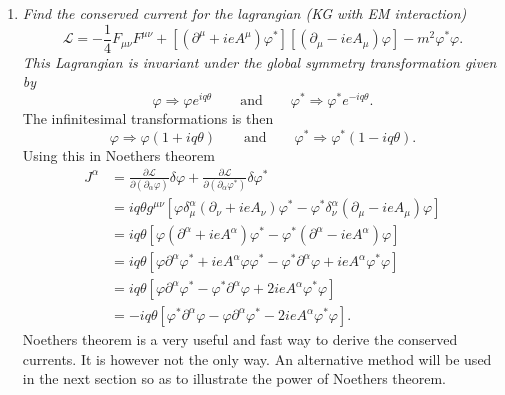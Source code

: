 \begin{example}
\begin{enumerate}
		\item \emph{Find the conserved current for the lagrangian (KG with EM interaction)}
		\begin{equation}
			\mathcal{L}=-\frac{1}{4}F_{\mu\nu}F^{\mu\nu}+[(\partial^{\mu}+ieA^{\mu})\varphi^*][(\partial_{\mu}-ieA_\mu)\varphi]-m^2\varphi^*\varphi.
		\end{equation} 
		\emph{This Lagrangian is invariant under the global symmetry transformation given by}
		\begin{equation}
			\varphi\Rightarrow \varphi e^{iq\theta} \qquad \mbox{and} \qquad \varphi^*\Rightarrow \varphi^* e^{-iq\theta}.
		\end{equation} 
		The infinitesimal transformations is then
		\begin{equation}
			\varphi\Rightarrow \varphi (1+iq\theta) \qquad \mbox{and} \qquad \varphi^*\Rightarrow \varphi^* (1-iq\theta).
		\end{equation} 
		Using this in Noethers theorem
		\begin{equation}
			\begin{split}
				J^\alpha&=\frac{\partial \mathcal{L}}{\partial (\partial_\alpha \varphi)}\delta\varphi+\frac{\partial \mathcal{L}}{\partial (\partial_\alpha \varphi^*)}\delta\varphi^*\\
				&=iq\theta g^{\mu\nu}[\varphi\delta_\mu^\alpha(\partial_{\nu}+ieA_{\nu})\varphi^*-\varphi^*\delta_{\nu}^\alpha(\partial_{\mu}-ieA_\mu)\varphi]\\
				&=iq\theta[\varphi(\partial^{\alpha}+ieA^{\alpha})\varphi^*-\varphi^*(\partial^{\alpha}-ieA^\alpha)\varphi]\\
				&=iq\theta[\varphi\partial^{\alpha}\varphi^*+ieA^{\alpha}\varphi\varphi^*-\varphi^*\partial^{\alpha}\varphi+ieA^\alpha\varphi^*\varphi]\\
				&=iq\theta[\varphi\partial^{\alpha}\varphi^*-\varphi^*\partial^{\alpha}\varphi+2ieA^\alpha\varphi^*\varphi]\\
				&=-iq\theta[\varphi^*\partial^{\alpha}\varphi-\varphi\partial^{\alpha}\varphi^*-2ieA^\alpha\varphi^*\varphi].
			\end{split}
			\label{bla7}
		\end{equation} 
		Noethers theorem is a very useful and fast way to derive the conserved currents. It is however not the only way. An alternative method will be used in the next section so as to illustrate the power of Noethers theorem.
	\end{enumerate}
\end{example}

